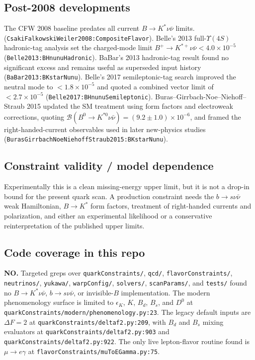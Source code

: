 \subsection*{Post-2008 developments}
The CFW 2008 baseline predates all current \(B\to K^*\nu\bar{\nu}\) limits.
(\texttt{CsakiFalkowskiWeiler2008:CompositeFlavor}).  Belle's 2013
full-\(\Upsilon(4S)\) hadronic-tag analysis set the charged-mode limit
\(B^+\to K^{*+}\nu\bar{\nu} <4.0\times10^{-5}\)
(\texttt{Belle2013:BHnunuHadronic}).  BaBar's 2013 hadronic-tag result found
no significant excess and remains useful as superseded input history
(\texttt{BaBar2013:BKstarNunu}).  Belle's 2017 semileptonic-tag search improved
the neutral mode to \(<1.8\times10^{-5}\) and quoted a combined vector limit of
\(<2.7\times10^{-5}\) (\texttt{Belle2017:BHnunuSemileptonic}).
Buras--Girrbach-Noe--Niehoff--Straub 2015 updated the SM treatment using form
factors and electroweak corrections, quoting
\(\mathcal{B}(B^0\to K^{*0}\nu\bar{\nu})=(9.2\pm1.0)\times10^{-6}\), and framed
the right-handed-current observables used in later new-physics studies
(\texttt{BurasGirrbachNoeNiehoffStraub2015:BKstarNunu}).

\subsection*{Constraint validity / model dependence}
Experimentally this is a clean missing-energy upper limit, but it is not a
drop-in bound for the present quark scan.  A production constraint needs the
\(b\to s\nu\bar{\nu}\) weak Hamiltonian, \(B\to K^*\) form factors, treatment of
right-handed currents and polarization, and either an experimental likelihood
or a conservative reinterpretation of the published upper limits.

\subsection*{Code coverage in this repo}
\textbf{NO.}  Targeted greps over \texttt{quarkConstraints/}, \texttt{qcd/},
\texttt{flavorConstraints/}, \texttt{neutrinos/}, \texttt{yukawa/},
\texttt{warpConfig/}, \texttt{solvers/}, \texttt{scanParams/}, and
\texttt{tests/} found no \(B\to K^*\nu\bar{\nu}\), \(b\to s\nu\bar{\nu}\), or
invisible-\(B\) implementation.  The modern phenomenology surface is limited
to \(\epsilon_K\), \(K\), \(B_d\), \(B_s\), and \(D^0\) at
\texttt{quarkConstraints/modern/phenomenology.py:23}.  The legacy default
inputs are \(\Delta F=2\) at \texttt{quarkConstraints/deltaf2.py:209}, with
\(B_d\) and \(B_s\) mixing evaluators at
\texttt{quarkConstraints/deltaf2.py:903} and
\texttt{quarkConstraints/deltaf2.py:922}.  The only live lepton-flavor routine
found is \(\mu\to e\gamma\) at \texttt{flavorConstraints/muToEGamma.py:75}.


